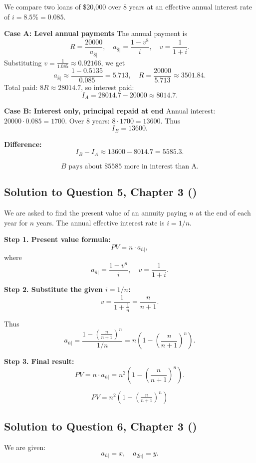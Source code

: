 \documentclass[12pt, a4paper]{article}
\begin{document}
We compare two loans of \$20{,}000 over 8 years at an effective annual interest rate of $i=8.5\% = 0.085$.

\textbf{Case A: Level annual payments}  
The annual payment is
\[
R = \frac{20000}{a_{\overline{8}|}}, \quad 
a_{\overline{8}|} = \frac{1-v^8}{i}, \quad v = \frac{1}{1+i}.
\]
Substituting $v=\tfrac{1}{1.085} \approx 0.92166$, we get
\[
a_{\overline{8}|} \approx \frac{1-0.5135}{0.085} = 5.713,
\quad R = \frac{20000}{5.713} \approx 3501.84.
\]
Total paid: $8R \approx 28014.7$,  
so interest paid:
\[
I_A = 28014.7 - 20000 \approx 8014.7.
\]

\textbf{Case B: Interest only, principal repaid at end}  
Annual interest: $20000 \cdot 0.085 = 1700$.  
Over 8 years: $8 \cdot 1700 = 13600$.  
Thus
\[
I_B = 13600.
\]

\textbf{Difference:}
\[
I_B - I_A \approx 13600 - 8014.7 = 5585.3.
\]

\[
\boxed{B \text{ pays about \$5585 more in interest than A.}}
\]

\subsection*{Solution to Question 5, Chapter 3 (\cite{toi3rd})}

We are asked to find the present value of an annuity paying $n$ at the end of each year for $n$ years.  
The annual effective interest rate is $i = 1/n$.

\textbf{Step 1. Present value formula:}
\[
PV = n \cdot a_{\overline{n}|},
\]
where
\[
a_{\overline{n}|} = \frac{1-v^n}{i}, 
\quad v = \frac{1}{1+i}.
\]

\textbf{Step 2. Substitute the given $i=1/n$:}
\[
v = \frac{1}{1+\tfrac{1}{n}} = \frac{n}{n+1}.
\]

Thus
\[
a_{\overline{n}|} 
= \frac{1-\left(\frac{n}{n+1}\right)^n}{1/n}
= n\left(1-\left(\frac{n}{n+1}\right)^n\right).
\]

\textbf{Step 3. Final result:}
\[
PV = n \cdot a_{\overline{n}|}
= n^2 \left(1-\left(\frac{n}{n+1}\right)^n\right).
\]

\[
\boxed{PV = n^2 \left(1-\left(\tfrac{n}{n+1}\right)^n\right)}
\]

\subsection*{Solution to Question 6, Chapter 3 (\cite{toi3rd})}

We are given:
\[
a_{\overline{n}|} = x, 
\quad a_{\overline{2n}|} = y.
\]
\end{document}
